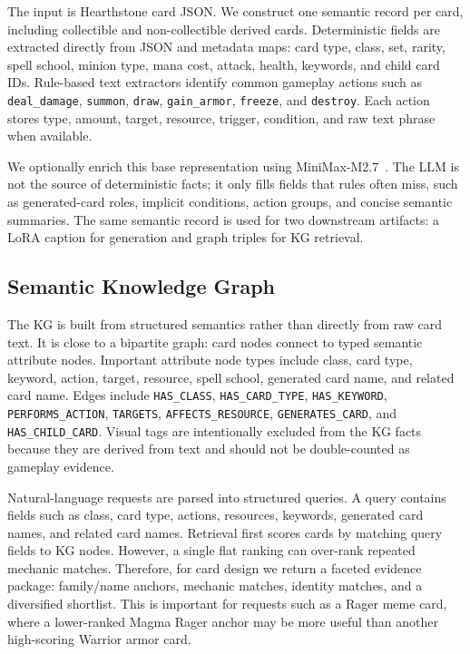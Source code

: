 \documentclass[10pt,twocolumn,letterpaper]{article}
\begin{document}
The input is Hearthstone card JSON. We construct one semantic record per card, including collectible and non-collectible derived cards. Deterministic fields are extracted directly from JSON and metadata maps: card type, class, set, rarity, spell school, minion type, mana cost, attack, health, keywords, and child card IDs. Rule-based text extractors identify common gameplay actions such as \texttt{deal\_damage}, \texttt{summon}, \texttt{draw}, \texttt{gain\_armor}, \texttt{freeze}, and \texttt{destroy}. Each action stores type, amount, target, resource, trigger, condition, and raw text phrase when available.

We optionally enrich this base representation using MiniMax-M2.7~\cite{minimaxm27}. The LLM is not the source of deterministic facts; it only fills fields that rules often miss, such as generated-card roles, implicit conditions, action groups, and concise semantic summaries. The same semantic record is used for two downstream artifacts: a LoRA caption for generation and graph triples for KG retrieval.

\subsection{Semantic Knowledge Graph}

The KG is built from structured semantics rather than directly from raw card text. It is close to a bipartite graph: card nodes connect to typed semantic attribute nodes. Important attribute node types include class, card type, keyword, action, target, resource, spell school, generated card name, and related card name. Edges include \texttt{HAS\_CLASS}, \texttt{HAS\_CARD\_TYPE}, \texttt{HAS\_KEYWORD}, \texttt{PERFORMS\_ACTION}, \texttt{TARGETS}, \texttt{AFFECTS\_RESOURCE}, \texttt{GENERATES\_CARD}, and \texttt{HAS\_CHILD\_CARD}. Visual tags are intentionally excluded from the KG facts because they are derived from text and should not be double-counted as gameplay evidence.

Natural-language requests are parsed into structured queries. A query contains fields such as class, card type, actions, resources, keywords, generated card names, and related card names. Retrieval first scores cards by matching query fields to KG nodes. However, a single flat ranking can over-rank repeated mechanic matches. Therefore, for card design we return a faceted evidence package: family/name anchors, mechanic matches, identity matches, and a diversified shortlist. This is important for requests such as a Rager meme card, where a lower-ranked Magma Rager anchor may be more useful than another high-scoring Warrior armor card.
\end{document}
